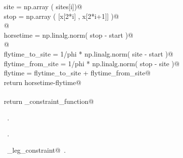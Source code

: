 \documentclass[11.5pt]{report}
\begin{document}
\begin{flushleft}
\begin{list}{}{}
\mbox{}\verb@               site  = np.array (  sites[i])@\\
\mbox{}\verb@               stop  = np.array (  [x[2*i]  , x[2*i+1]]  )@\\
\mbox{}\verb@            @\\
\mbox{}\verb@               horsetime = np.linalg.norm( stop - start )@\\
\mbox{}\verb@           @\\
\mbox{}\verb@               flytime_to_site   = 1/phi * np.linalg.norm( site - start )@\\
\mbox{}\verb@               flytime_from_site = 1/phi * np.linalg.norm( stop - site  )@\\
\mbox{}\verb@               flytime           = flytime_to_site + flytime_from_site@\\
\mbox{}\verb@               return horsetime-flytime@\\
\mbox{}\verb@@\\
\mbox{}\verb@            return _constraint_function@\\
\mbox{}\verb@@{\NWsep}
\end{list}
\vspace{-1.5ex}
\footnotesize
\begin{list}{}{\setlength{\itemsep}{-\parsep}\setlength{\itemindent}{-\leftmargin}}
\item \NWtxtMacroDefBy\ .
\item \NWtxtMacroRefIn\ .
\item \NWtxtIdentsDefed\nobreak\  \verb@ith_leg_constraint@\nobreak\ .
\item{}
\end{list}
\vspace{4ex}
\end{flushleft}
\end{document}
